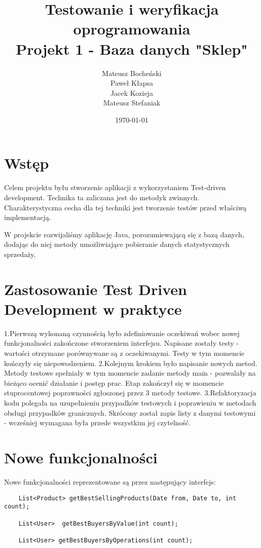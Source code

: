 \documentclass[a4paper,11pt,notitlepage]{article}
\author{Mateusz Bocheński\\Paweł Kłapsa\\Jacek Kozieja\\Mateusz Stefaniak}
\title{Testowanie i weryfikacja oprogramowania \\ {\small Projekt 1 - Baza danych "Sklep"}}
\date{\today}
\begin{document}
\maketitle
\tableofcontents

\section{Wstęp}
Celem projektu byłu stworzenie aplikacji z wykorzystaniem Test-driven development. Technika ta zaliczana jest do metodyk zwinnych. Charakterystyczna cecha dla tej techniki jest tworzenie testów przed właściwą implementacją.

W projekcie rozwijaliśmy aplikację Java, porozumiewającą się z bazą danych, dodając do niej metody umożliwiające pobieranie danych statystycznych sprzedaży.
\section{Zastosowanie Test Driven Development w praktyce}
1.Pierwszą wykonaną czynnością było zdefiniowanie oczekiwań wobec nowej funkcjonalności zakończone stworzeniem interfejsu. Napisane zostały testy - wartości otrzymane porównywane są z oczekiwanymi. Testy w tym momencie kończyły się niepowodzeniem.
2.Kolejnym krokiem było napisanie nowych metod. Metody testowe spełniały w tym momencie zadanie metody main - pozwalały na bieżąco ocenić działanie i postęp prac. Etap zakończył się w momencie stuprocentowej poprawności zgłoszonej przez 3 metody testowe.
3.Refaktoryzacja kodu polegała na uzupełnieniu przypadków testowych i poprawieniu w metodach obsługi przypadków granicznych. Skrócony został zapis listy z danymi testowymi - wcześniej wymagana była przede wszystkim jej czytelność.

\section{Nowe funkcjonalności}
Nowe funkcjonalności reprezentowane są przez następujący interfejs:
\begin{footnotesize}\begin{verbatim}
    List<Product> getBestSellingProducts(Date from, Date to, int count);

    List<User>  getBestBuyersByValue(int count);

    List<User> getBestBuyersByOperations(int count);
\end{verbatim}\end{footnotesize}
\end{document}
